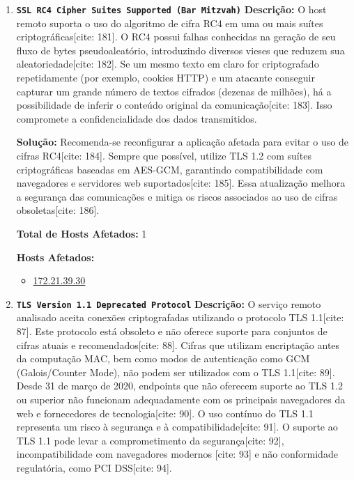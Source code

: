 \documentclass[a4paper,12pt]{article}
\begin{document}
\begin{enumerate}
\item \textbf{\texttt{SSL RC4 Cipher Suites Supported (Bar Mitzvah)}}
\textbf{Descrição:} O host remoto suporta o uso do algoritmo de cifra RC4 em uma ou mais suítes criptográficas[cite: 181]. O RC4 possui falhas conhecidas na geração de seu fluxo de bytes pseudoaleatório, introduzindo diversos vieses que reduzem sua aleatoriedade[cite: 182]. Se um mesmo texto em claro for criptografado repetidamente (por exemplo, cookies HTTP) e um atacante conseguir capturar um grande número de textos cifrados (dezenas de milhões), há a possibilidade de inferir o conteúdo original da comunicação[cite: 183]. Isso compromete a confidencialidade dos dados transmitidos.

\textbf{Solução:} Recomenda-se reconfigurar a aplicação afetada para evitar o uso de cifras RC4[cite: 184]. Sempre que possível, utilize TLS 1.2 com suítes criptográficas baseadas em AES-GCM, garantindo compatibilidade com navegadores e servidores web suportados[cite: 185]. Essa atualização melhora a segurança das comunicações e mitiga os riscos associados ao uso de cifras obsoletas[cite: 186].

\textbf{Total de Hosts Afetados:} 1

\textbf{Hosts Afetados:}
\begin{itemize}
    \item \url{172.21.39.30}
\end{itemize}

\item \textbf{\texttt{TLS Version 1.1 Deprecated Protocol}}
\textbf{Descrição:} O serviço remoto analisado aceita conexões criptografadas utilizando o protocolo TLS 1.1[cite: 87]. Este protocolo está obsoleto e não oferece suporte para conjuntos de cifras atuais e recomendados[cite: 88]. Cifras que utilizam encriptação antes da computação MAC, bem como modos de autenticação como GCM (Galois/Counter Mode), não podem ser utilizados com o TLS 1.1[cite: 89]. Desde 31 de março de 2020, endpoints que não oferecem suporte ao TLS 1.2 ou superior não funcionam adequadamente com os principais navegadores da web e fornecedores de tecnologia[cite: 90]. O uso contínuo do TLS 1.1 representa um risco à segurança e à compatibilidade[cite: 91]. O suporte ao TLS 1.1 pode levar a comprometimento da segurança[cite: 92], incompatibilidade com navegadores modernos [cite: 93] e não conformidade regulatória, como PCI DSS[cite: 94].


\end{enumerate}
\end{document}
